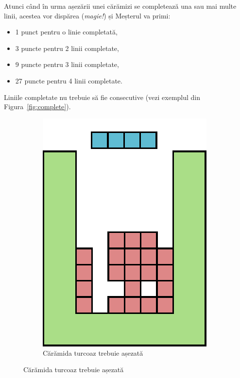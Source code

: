 \documentclass[12pt]{article}
\begin{document}
Atunci când în urma așezării unei cărămizi se completează una sau mai
multe linii, acestea vor dispărea (\emph{magie!}) și Meșterul va
primi:
\begin{itemize}
\item 1 punct pentru o linie completată,
\item 3 puncte pentru 2 linii completate,
\item 9 puncte pentru 3 linii completate,
\item 27 puncte pentru 4 linii completate.
\end{itemize}
Liniile completate nu trebuie să fie consecutive (vezi exemplul din
Figura~\ref{fig:complete}).

\begin{figure}[h!]
  \centering
  \begin{subfigure}[t]{0.23\textwidth}
    \includegraphics[width=\textwidth]{graphics/threelinesA.pdf}
    \caption{Cărămida turcoaz trebuie așezată}

\end{subfigure}
\end{figure}
\end{document}
